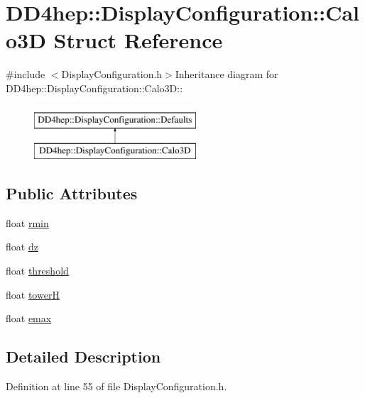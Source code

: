 \hypertarget{struct_d_d4hep_1_1_display_configuration_1_1_calo3_d}{
\section{DD4hep::DisplayConfiguration::Calo3D Struct Reference}
\label{struct_d_d4hep_1_1_display_configuration_1_1_calo3_d}
}


{\ttfamily \#include $<$DisplayConfiguration.h$>$}Inheritance diagram for DD4hep::DisplayConfiguration::Calo3D::\begin{figure}[H]
\begin{center}
\leavevmode
\includegraphics[height=2cm]{struct_d_d4hep_1_1_display_configuration_1_1_calo3_d}
\end{center}
\end{figure}
\subsection*{Public Attributes}
\begin{DoxyCompactItemize}
\item 
float \hyperlink{struct_d_d4hep_1_1_display_configuration_1_1_calo3_d_ade7d636fe0552c821c519d838ec4e9cc}{rmin}
\item 
float \hyperlink{struct_d_d4hep_1_1_display_configuration_1_1_calo3_d_a4c83ddd5abab41aede5327a47d1bffcc}{dz}
\item 
float \hyperlink{struct_d_d4hep_1_1_display_configuration_1_1_calo3_d_a5d8b964880761613aa41ee542ce93a48}{threshold}
\item 
float \hyperlink{struct_d_d4hep_1_1_display_configuration_1_1_calo3_d_a85221f1dde131cdf60a25bffef79325f}{towerH}
\item 
float \hyperlink{struct_d_d4hep_1_1_display_configuration_1_1_calo3_d_a2a0ed0362e5b09927938df5c3d98d6b9}{emax}
\end{DoxyCompactItemize}


\subsection{Detailed Description}


Definition at line 55 of file DisplayConfiguration.h.


